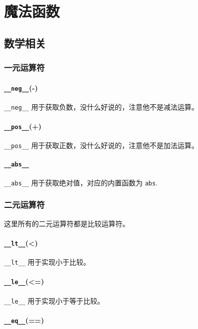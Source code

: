\chapter{魔法函数}
\section{数学相关}
\subsection{一元运算符}

\subsubsection{\texttt{\_\_neg\_\_}(-)}

\texttt{\_\_neg\_\_} 用于获取负数，没什么好说的，注意他不是减法运算。

\subsubsection{\texttt{\_\_pos\_\_}(+)}

\texttt{\_\_pos\_\_} 用于获取正数，没什么好说的，注意他不是加法运算。

\subsubsection{\texttt{\_\_abs\_\_}}

\texttt{\_\_abs\_\_} 用于获取绝对值，对应的内置函数为 \texttt{abs}.

\subsection{二元运算符}

这里所有的二元运算符都是比较运算符。

\subsubsection{\texttt{\_\_lt\_\_}(<)}

\texttt{\_\_lt\_\_} 用于实现小于比较。

\subsubsection{\texttt{\_\_le\_\_}(<=)}

\texttt{\_\_le\_\_} 用于实现小于等于比较。

\subsubsection{\texttt{\_\_eq\_\_}(==)}

